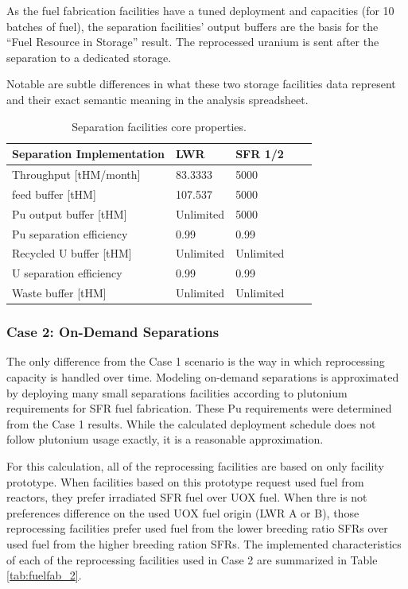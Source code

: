 \documentclass[12pt]{article}
\begin{document}
As the fuel fabrication facilities have a tuned deployment and capacities (for
10 batches of fuel), the separation facilities' output buffers are the basis for
the ``Fuel Resource in Storage'' result.  The reprocessed uranium is sent after
the separation to a dedicated storage.

Notable are subtle differences in what these two storage facilities data represent
and their exact semantic meaning in the analysis spreadsheet.

\begin{table}[h!]
    \centering
    \begin{tabular}{lllll}
    \hline
    Separation Implementation  &  LWR        &  SFR 1/2    \\
    \hline
    Throughput [tHM/month]     &  83.3333    &  5000       \\
    feed buffer [tHM]          &  107.537    &  5000       \\
    Pu output buffer [tHM]     &  Unlimited  &  5000       \\
    Pu separation efficiency   &  0.99       &  0.99       \\
    Recycled U buffer [tHM]    &  Unlimited  &  Unlimited  \\
    U separation efficiency    &  0.99       &  0.99       \\
    Waste buffer [tHM]         &  Unlimited  &  Unlimited  \\
    \hline
    \end{tabular}
    \caption{Separation facilities core properties. }
    \label{tab:separation_1}
\end{table}

\subsubsection{Case 2: On-Demand Separations}
\label{sec:case2}

The only difference from the Case 1 scenario is the way in which reprocessing
capacity is handled over time.  Modeling on-demand separations is approximated by
deploying many small separations facilities according to plutonium requirements
for SFR fuel fabrication.  These Pu requirements were determined from the Case 1
results. While the calculated deployment schedule does not follow plutonium usage
exactly, it is a reasonable approximation.

For this calculation, all of the reprocessing facilities are based on only
facility prototype.  When facilities based on this prototype request used fuel
from reactors, they prefer irradiated SFR fuel over UOX fuel. When thre is not
preferences difference on the used UOX fuel origin (LWR A or B), those
reprocessing facilities prefer used fuel from the lower breeding ratio SFRs
over used fuel from the higher breeding ration SFRs. The implemented
characteristics of each of the reprocessing facilities used in Case 2 are
summarized in Table \ref{tab:fuelfab_2}.
\end{document}
